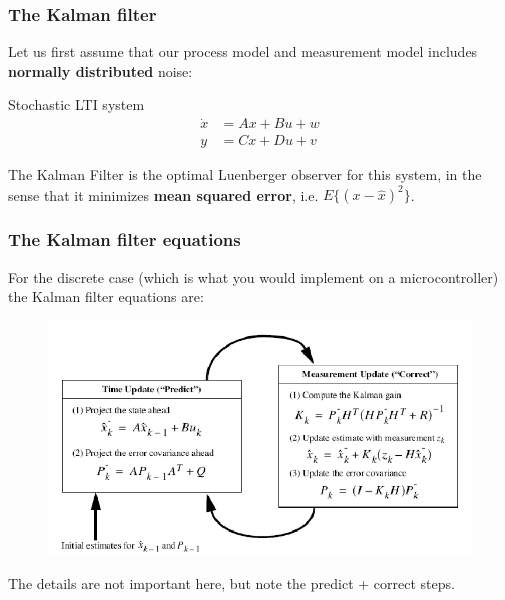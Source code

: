 \documentclass{beamer}
\begin{document}

\begin{frame}
    \frametitle{The Kalman filter}
    Let us first assume that our process model and measurement model includes \textbf{normally distributed} noise:
    \begin{block}{Stochastic LTI system}
        \begin{equation}
            \begin{aligned}
                \dot{x} &= A x + B u + w \\
                y &=C x + D u + v
            \end{aligned}
        \end{equation}
    \end{block}
    The Kalman Filter is the optimal Luenberger observer for this system, in the sense that it minimizes \textbf{mean squared error}, i.e. $E\{(x-\hat{x})^2\}$. 
\end{frame}


\begin{frame}
    \frametitle{The Kalman filter equations}
    For the discrete case (which is what you would implement on a microcontroller) the Kalman filter equations are:
    \begin{figure}
        \includegraphics[width=0.8\linewidth]{kf_equations.png}
    \end{figure}
    The details are not important here, but note the predict + correct steps. 
\end{frame}

\end{document}
